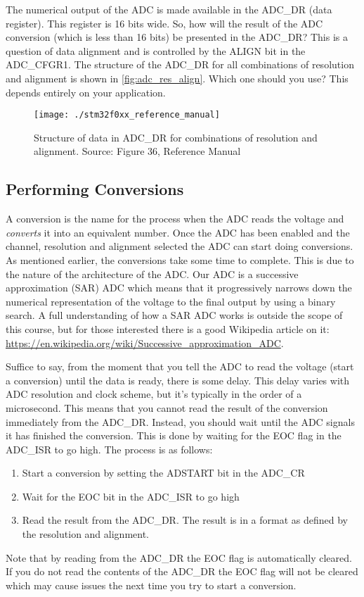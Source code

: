 The numerical output of the ADC is made available in the ADC\_DR (data register). This register is 16 bits wide. So, how will the result of the ADC conversion (which is less than 16 bits) be presented in the ADC\_DR? This is a question of data alignment and is controlled by the ALIGN bit in the ADC\_CFGR1. The structure of the ADC\_DR for all combinations of resolution and alignment is shown in \autoref{fig:adc_res_align}. Which one should you use? This depends entirely on your application. 

\begin{figure}
\centering
\texttt{[image: ./stm32f0xx\_reference\_manual]}
\caption{Structure of data in ADC\_DR for combinations of resolution and alignment. Source: Figure 36, Reference Manual}
\label{fig:adc_res_align}
\end{figure}

\subsection{Performing Conversions}
A conversion is the name for the process when the ADC reads the voltage and \emph{converts} it into an equivalent number.
Once the ADC has been enabled and the channel, resolution and alignment selected the ADC can start doing conversions. As mentioned earlier, the conversions take some time to complete. This is due to the nature of the architecture of the ADC. Our ADC is a successive approximation (SAR) ADC which means that it progressively narrows down the numerical representation of the voltage to the final output by using a binary search. A full understanding of how a SAR ADC works is outside the scope of this course, but for those interested there is a good Wikipedia article on it: \url{https://en.wikipedia.org/wiki/Successive_approximation_ADC}. 

Suffice to say, from the moment that you tell the ADC to read the voltage (start a conversion) until the data is ready, there is some delay. This delay varies with ADC resolution and clock scheme, but it's typically in the order of a microsecond. This means that you cannot read the result of the conversion immediately from the ADC\_DR. Instead, you should wait until the ADC signals it has finished the conversion. This is done by waiting for the EOC flag in the ADC\_ISR to go high. The process is as follows:
\begin{enumerate}
\item Start a conversion by setting the ADSTART bit in the ADC\_CR
\item Wait for the EOC bit in the ADC\_ISR to go high
\item Read the result from the ADC\_DR. The result is in a format as defined by the resolution and alignment. 
\end{enumerate}
Note that by reading from the ADC\_DR the EOC flag is automatically cleared. If you do not read the contents of the ADC\_DR the EOC flag will not be cleared which may cause issues the next time you try to start a conversion. 



